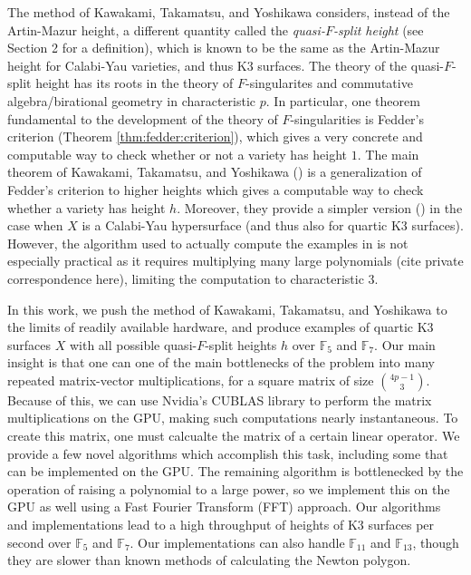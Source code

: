 The method of Kawakami, Takamatsu, and Yoshikawa considers, 
instead of the Artin-Mazur height, a different quantity called the
\textit{quasi-\(F\)-split height} 
(see Section 2 for a definition),
which is known to be the same as the Artin-Mazur height
for Calabi-Yau varieties, and thus K3 surfaces.
The theory of the quasi-\(F\)-split height has its
roots in the theory of \(F\)-singularites and commutative
algebra/birational geometry in characteristic \(p\).
In particular, one theorem fundamental
to the development of the theory of \(F\)-singularities
is Fedder's criterion (Theorem \ref{thm:fedder:criterion}), 
which gives a very concrete and computable way to check
whether or not a variety has height \(1\).
The main theorem of Kawakami, Takamatsu, and Yoshikawa
(\cite[Theorem~A]{kty-2022-fedder})
is a generalization of Fedder's criterion
to higher heights which gives a 
computable way to check whether a variety has height \(h\).
Moreover, they provide a simpler version
(\cite[Theorem~C]{kty-2022-fedder})
in the case when \(X\) is a Calabi-Yau hypersurface
(and thus also for quartic K3 surfaces).
However, the algorithm used to actually compute the examples
in \cite{kty-2022-fedder} is not especially practical
as it requires multiplying many large polynomials
(cite private correspondence here),
limiting the computation 
to characteristic \(3\).

In this work, we push the method of Kawakami,
Takamatsu, and Yoshikawa to the limits of readily
available hardware, 
and produce examples of quartic K3 surfaces \(X\) with all
possible quasi-\(F\)-split heights \(h\) 
over \(\mathbb{F}_{5}\) and \(\mathbb{F}_{7}\).
Our main insight is that one can one of the main
bottlenecks of the problem into many repeated matrix-vector
multiplications, for a square matrix of size 
\(\binom{4p-1}{3}\).
Because of this, we can use Nvidia's CUBLAS library 
\cite{nvidia-2024-cublas}
to perform the matrix multiplications
on the GPU, making such computations
nearly instantaneous.
To create this matrix, one must calcualte the matrix of a
certain linear operator.
We provide a few novel algorithms which accomplish this task,
including some that can be implemented on the GPU.
The remaining algorithm is bottlenecked by the operation
of raising a polynomial to a large power, 
so we implement this on the GPU as well using 
a Fast Fourier Transform (FFT) approach.
Our algorithms and implementations lead to a high throughput
of heights of K3 surfaces per second over \(\mathbb{F}_{5}\) and
\(\mathbb{F}_{7}\).
Our implementations can also handle \(\mathbb{F}_{11}\) 
and \(\mathbb{F}_{13}\), though they are slower than known methods
of calculating the Newton polygon.

